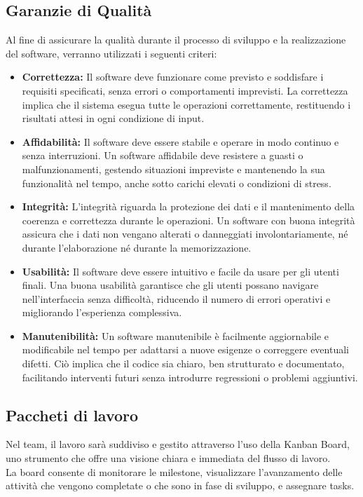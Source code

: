\documentclass[a4paper,12pt]{article}
\begin{document}
\subsection{Garanzie di Qualità} %
Al fine di assicurare la qualità durante il processo di sviluppo e la realizzazione del software,
verranno utilizzati i seguenti criteri:  
\begin{itemize}
    \item \textbf{Correttezza:}  
    Il software deve funzionare come previsto e soddisfare i requisiti specificati, senza errori o comportamenti imprevisti. La correttezza implica che il sistema esegua tutte le operazioni correttamente, restituendo i risultati attesi in ogni condizione di input.

    \item \textbf{Affidabilità:}  
    Il software deve essere stabile e operare in modo continuo e senza interruzioni. Un software affidabile deve resistere a guasti o malfunzionamenti, gestendo situazioni impreviste e mantenendo la sua funzionalità nel tempo, anche sotto carichi elevati o condizioni di stress.

    \item \textbf{Integrità:}  
    L'integrità riguarda la protezione dei dati e il mantenimento della coerenza e correttezza durante le operazioni. Un software con buona integrità assicura che i dati non vengano alterati o danneggiati involontariamente, né durante l'elaborazione né durante la memorizzazione.

    \item \textbf{Usabilità:}  
    Il software deve essere intuitivo e facile da usare per gli utenti finali. Una buona usabilità garantisce che gli utenti possano navigare nell'interfaccia senza difficoltà, riducendo il numero di errori operativi e migliorando l'esperienza complessiva.

    \item \textbf{Manutenibilità:}  
    Un software manutenibile è facilmente aggiornabile e modificabile nel tempo per adattarsi a nuove esigenze o correggere eventuali difetti. Ciò implica che il codice sia chiaro, ben strutturato e documentato, facilitando interventi futuri senza introdurre regressioni o problemi aggiuntivi.
\end{itemize}

\subsection{Paccheti di lavoro} %
Nel team, il lavoro sarà suddiviso e gestito attraverso l'uso della Kanban Board, uno strumento che offre una visione chiara e immediata del flusso di lavoro.\\ 
La board consente di monitorare le milestone, visualizzare l'avanzamento delle attività che vengono completate o che sono in fase di sviluppo, e assegnare tasks.
\end{document}
